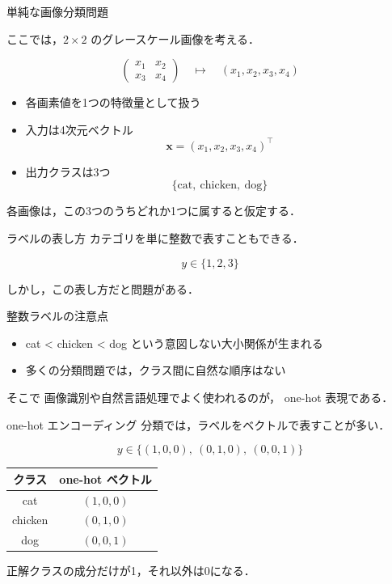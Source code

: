 \documentclass[dvipdfmx,uplatex,11pt]{beamer}
\begin{document}


\begin{frame}{単純な画像分類問題}

ここでは，$2 \times 2$ のグレースケール画像を考える．

\[
\begin{pmatrix}
x_1 & x_2\\
x_3 & x_4
\end{pmatrix}
\quad \longmapsto \quad
(x_1,x_2,x_3,x_4)
\]

\begin{itemize}
  \item 各画素値を1つの特徴量として扱う
  \item 入力は4次元ベクトル
  \[
  \bm{x} = (x_1,x_2,x_3,x_4)^\top
  \]
  \item 出力クラスは3つ
  \[
  \{\text{cat},\ \text{chicken},\ \text{dog}\}
  \]
\end{itemize}
各画像は，この3つのうち\alert{どれか1つ}に属すると仮定する．

\end{frame}
\begin{frame}{ラベルの表し方}
カテゴリを単に整数で表すこともできる．

\[
  y \in \{1,2,3\}
\]

\vspace{1em}
しかし，この表し方だと問題がある．

\begin{alertblock}{整数ラベルの注意点}
\begin{itemize}
  \item cat < chicken < dog という意図しない大小関係が生まれる
  \item 多くの分類問題では，クラス間に自然な順序はない
\end{itemize}
\end{alertblock}

\begin{block}{そこで}
画像識別や自然言語処理でよく使われるのが，
\alert{one-hot 表現}である．
\end{block}


\end{frame}

\begin{frame}{one-hot エンコーディング}
分類では，ラベルをベクトルで表すことが多い．

\[
y \in \{(1,0,0),\ (0,1,0),\ (0,0,1)\}
\]

\vspace{1em}
\begin{center}
\begin{tabular}{c|c}
クラス & one-hot ベクトル \\ \hline
cat & $(1,0,0)$ \\
chicken & $(0,1,0)$ \\
dog & $(0,0,1)$
\end{tabular}
\end{center}

\vspace{1em}
\centering
正解クラスの成分だけが\alert{1}，それ以外は\alert{0}になる．
\end{frame}
\end{document}
